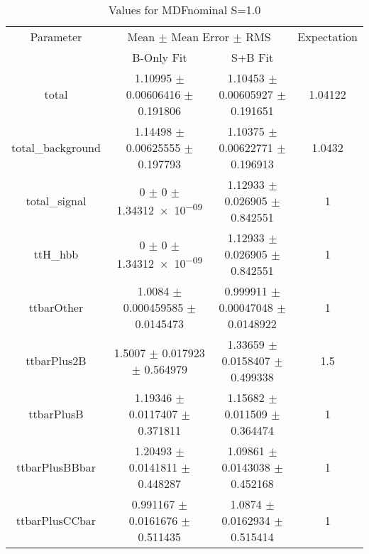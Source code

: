 \begin{table}
\centering
\caption{Values for MDFnominal S=1.0}
\begin{tabular}{cccc}
\toprule
Parameter & \multicolumn{2}{c}{Mean $\pm$ Mean Error $\pm$ RMS} & Expectation\\
 & B-Only Fit & S+B Fit & \\
\midrule
total & \num{1.10995} $\pm$ \num{0.00606416} $\pm$ \num{0.191806} & \num{1.10453} $\pm$ \num{0.00605927} $\pm$ \num{0.191651} & \num{1.04122}\\
total\_background & \num{1.14498} $\pm$ \num{0.00625555} $\pm$ \num{0.197793} & \num{1.10375} $\pm$ \num{0.00622771} $\pm$ \num{0.196913} & \num{1.0432}\\
total\_signal & \num{0} $\pm$ \num{0} $\pm$ \num{1.34312e-09} & \num{1.12933} $\pm$ \num{0.026905} $\pm$ \num{0.842551} & \num{1}\\
ttH\_hbb & \num{0} $\pm$ \num{0} $\pm$ \num{1.34312e-09} & \num{1.12933} $\pm$ \num{0.026905} $\pm$ \num{0.842551} & \num{1}\\
ttbarOther & \num{1.0084} $\pm$ \num{0.000459585} $\pm$ \num{0.0145473} & \num{0.999911} $\pm$ \num{0.00047048} $\pm$ \num{0.0148922} & \num{1}\\
ttbarPlus2B & \num{1.5007} $\pm$ \num{0.017923} $\pm$ \num{0.564979} & \num{1.33659} $\pm$ \num{0.0158407} $\pm$ \num{0.499338} & \num{1.5}\\
ttbarPlusB & \num{1.19346} $\pm$ \num{0.0117407} $\pm$ \num{0.371811} & \num{1.15682} $\pm$ \num{0.011509} $\pm$ \num{0.364474} & \num{1}\\
ttbarPlusBBbar & \num{1.20493} $\pm$ \num{0.0141811} $\pm$ \num{0.448287} & \num{1.09861} $\pm$ \num{0.0143038} $\pm$ \num{0.452168} & \num{1}\\
ttbarPlusCCbar & \num{0.991167} $\pm$ \num{0.0161676} $\pm$ \num{0.511435} & \num{1.0874} $\pm$ \num{0.0162934} $\pm$ \num{0.515414} & \num{1}\\
\bottomrule
\end{tabular}
\end{table}